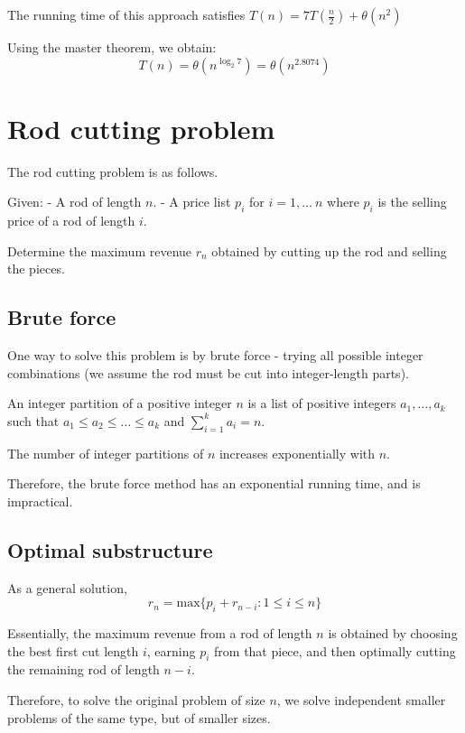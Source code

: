 \documentclass[11pt]{article}
\begin{document}
The running time of this approach satisfies
\(T(n) = 7T(\frac{n}{2}) + \theta(n^2)\)

Using the master theorem, we obtain:
\[T(n) = \theta(n^{\log_2 7}) = \theta(n^{2.8074})\]

    \section{Rod cutting problem}\label{rod-cutting-problem}

The rod cutting problem is as follows.

Given: - A rod of length \(n\). - A price list \(p_i\) for
\(i = 1, \ldots\ n\) where \(p_i\) is the selling price of a rod of
length \(i\).

Determine the maximum revenue \(r_n\) obtained by cutting up the rod and
selling the pieces.

\subsection{Brute force}\label{brute-force}

One way to solve this problem is by brute force - trying all possible
integer combinations (we assume the rod must be cut into integer-length
parts).

An integer partition of a positive integer \(n\) is a list of positive
integers \(a_1, \ldots , a_k\) such that
\(a_1 \leq a_2 \leq \ldots \leq a_k\) and \(\sum_{i=1}^k a_i = n\).

The number of integer partitions of \(n\) increases exponentially with
\(n\).

Therefore, the brute force method has an exponential running time, and
is impractical.

    \subsection{Optimal substructure}\label{optimal-substructure}

As a general solution,
\[r_n = \text{max} \{p_i + r_{n-i}: 1 \leq i \leq n\}\]

Essentially, the maximum revenue from a rod of length \(n\) is obtained
by choosing the best first cut length \(i\), earning \(p_i\) from that
piece, and then optimally cutting the remaining rod of length \(n-i\).

Therefore, to solve the original problem of size \(n\), we solve
independent smaller problems of the same type, but of smaller sizes.
\end{document}
